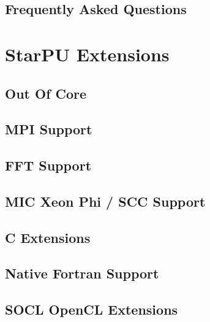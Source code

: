 \chapter{Frequently Asked Questions}
\label{FrequentlyAskedQuestions}
\hypertarget{FrequentlyAskedQuestions}{}


\part{StarPU Extensions}

\chapter{Out Of Core}
\label{OutOfCore}
\hypertarget{OutOfCore}{}


\chapter{MPI Support}
\label{MPISupport}
\hypertarget{MPISupport}{}


\chapter{FFT Support}
\label{FFTSupport}
\hypertarget{FFTSupport}{}


\chapter{MIC Xeon Phi / SCC Support}
\label{MICSCCSupport}
\hypertarget{MICSCCSupport}{}


\chapter{C Extensions}
\label{cExtensions}
\hypertarget{cExtensions}{}


\chapter{Native Fortran Support}
\label{NativeFortranSupport}
\hypertarget{NativeFortranSupport}{}


\chapter{SOCL OpenCL Extensions}
\label{SOCLOpenclExtensions}
\hypertarget{SOCLOpenclExtensions}{}


